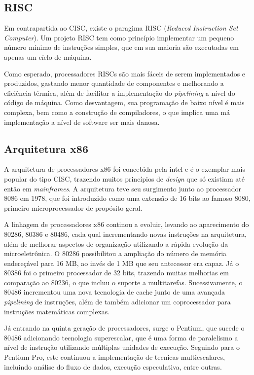 \documentclass{article}
\begin{document}
\subsection{RISC}
Em contrapartida ao CISC, existe o paragima RISC (\textit{Reduced Instruction
Set Computer}). Um projeto RISC tem como princípio implementar um pequeno
número mínimo de instruções simples, que em sua maioria são executadas em
apenas um cíclo de máquina.

Como esperado, processadores RISCs são mais fáceis de serem implementados e
produzidos, gastando menor quantidade de componentes e melhorando a eficiência
térmica, além de facilitar a implementação do \textit{pipelining} a nível do
código de máquina. Como desvantagem, sua programação de baixo nível é mais
complexa, bem como a construção de compiladores, o que implica uma má
implementação a nível de software ser mais danosa.

\subsection{Arquitetura x86} 
A arquitetura de processadores x86 foi concebida pela intel e é o exemplar mais
popular do tipo CISC, trazendo muitos princípios de \textit{design} que só
existiam até então em \textit{mainframes}. A arquitetura teve seu surgimento
junto ao processador 8086 em 1978, que foi introduzido como uma extensão de 16
bits ao famoso 8080, primeiro microprocessador de propósito geral.

A linhagem de processadores x86 continou a evoluir, levando ao aparecimento do
80286, 80386 e 80486, cada qual incrementando novas instruções na arquitetura,
além de melhorar aspectos de organização utilizando a rápida evolução da
microeletrônica. O 80286 possibilitou a ampliação do número de memória
endereçável para 16 MB, ao invés de 1 MB que seu antecessor era capaz. Já o
80386 foi o primeiro processador de 32 bits, trazendo muitas melhorias em
comparação ao 80236, o que incluu o suporte a multitarefas. Sucessivamente,
o 80486 incrementou uma nova tecnologia de cache junto de uma avançada
\textit{pipelining} de instruções, além de também adicionar um coprocessador
para instruções matemáticas complexas.

Já entrando na quinta geração de processadores, surge o Pentium, que sucede o
80486 adicionando tecnologia superescalar, que é uma forma de paralelismo a
nível de instrução utilizando múltiplas unidades de execução. Seguindo para
o Pentium Pro, este continuou a implementação de tecnicas multiescalares,
incluindo análise do fluxo de dados, execução especulativa, entre outras.
\end{document}
